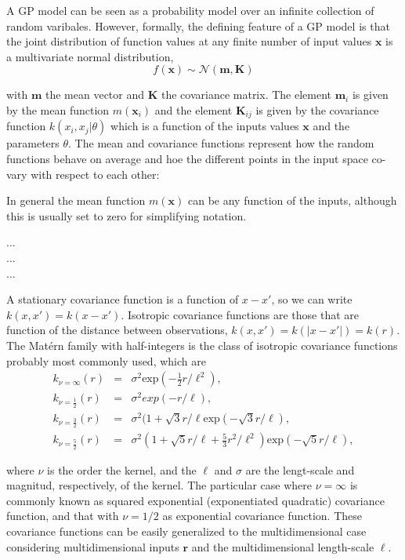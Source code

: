 \documentclass[]{interact}
\theoremstyle{plain}%
\theoremstyle{definition}
\theoremstyle{remark}
\begin{document}
A GP model can be seen as a probability model over an infinite collection of random varibales. However, formally, the defining feature of a GP model is that the joint distribution of function values at any finite number of input values $\mathbf{x}$ is a multivariate normal distribution, 
%
\begin{equation}
f(\mathbf{x}) \sim \mathcal{N}(\mathbf{m},\mathbf{K})
\end{equation}

\noindent with $\mathbf{m}$ the mean vector and $\mathbf{K}$ the covariance matrix. The element $\mathbf{m}_i$ is given by the mean function $m(\mathbf{x}_i)$ and the element $\mathbf{K}_{ij}$ is given by the covariance function $k(x_i,x_j|\theta)$ which is a function of the inputs values $\mathbf{x}$ and the parameters $\theta$. The mean and covariance functions represent how the random functions behave on average and hoe the different points in the input space co-vary with respect to each other:


 In general the mean function $m(\mathbf{x})$ can be any function of the inputs, although this is usually set to zero for simplifying notation. 

\vspace{0.5cm}
\noindent ... \\
... \\
...


\vspace{0.5cm}
A stationary covariance function is a function of $x-x'$, so we can write $k(x,x') = k(x-x')$. Isotropic covariance functions are those that are function of the distance between observations, $k(x,x') = k(|x-x'|) = k(r)$. The Mat\'ern family with half-integers is the class of isotropic covariance functions probably most commonly used, which are
%
\begin{eqnarray}
k_{\nu=\infty}(r)&=&\sigma^2 \text{exp}(-\frac{1}{2} r/\ell^2), \nonumber \\
k_{\nu=\frac{1}{2}}(r)&=&\sigma^2 exp(-r/\ell), \nonumber \\
k_{\nu=\frac{3}{2}}(r)&=&\sigma^2(1+\sqrt{3}r/\ell \text{exp}(-\sqrt{3}r/\ell), \nonumber \\
k_{\nu=\frac{5}{2}}(r)&=&\sigma^2(1+\sqrt{5}r/\ell+\frac{5}{3}r^2/\ell^2) \text{exp}(-\sqrt{5}r/\ell), \nonumber 
\end{eqnarray}

\noindent where $\nu$ is the order the kernel, and the $\ell$ and $\sigma$ are the lengt-scale and magnitud, respectively, of the kernel. The particular case where $\nu=\infty$ is commonly known as squared exponential (exponentiated quadratic) covariance function, and that with $\nu=1/2$ as exponential covariance function. These covariance functions can be easily generalized to the multidimensional case considering multidimensional inputs $\mathbf{r}$ and the multidimensional length-scale $\boldsymbol{\ell}$. 
\end{document}
